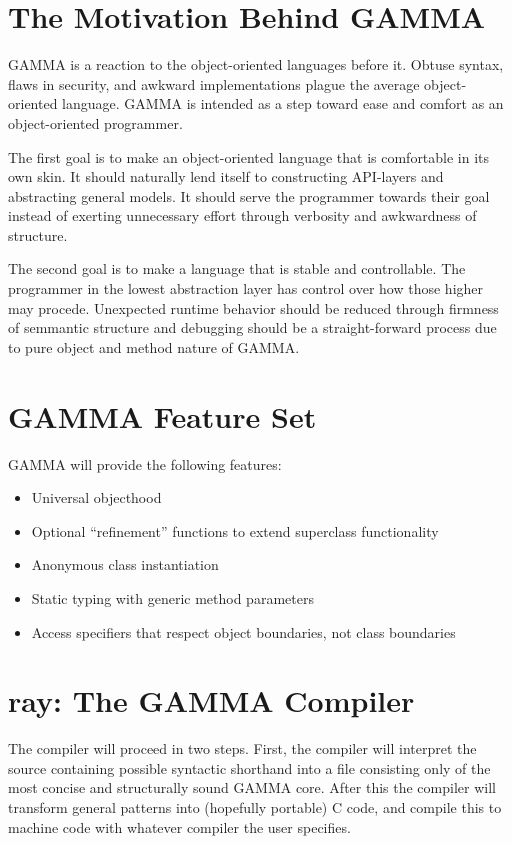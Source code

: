 \documentclass[10pt]{article}
\newcommand{\Lang}{GAMMA}
\newcommand{\Compiler}{ray}
\begin{document}
\section*{ The Motivation Behind \Lang{}}
\Lang{} is a reaction to the object-oriented languages before it. Obtuse syntax, flaws in security, and awkward implementations plague the average object-oriented language. \Lang{} is intended as a step toward ease and comfort as an object-oriented programmer.


The first goal is to make an object-oriented language that is comfortable in its own skin. It should naturally lend itself to constructing API-layers and abstracting general models. It should serve the programmer towards their goal instead of exerting unnecessary effort through verbosity and awkwardness of structure.


The second goal is to make a language that is stable and controllable. The programmer in the lowest abstraction layer has control over how those higher may procede. Unexpected runtime behavior should be reduced through firmness of semmantic structure and debugging should be a straight-forward process due to pure object and method nature of \Lang{}.

\section*{\Lang{} Feature Set}

\Lang{} will provide the following features:

\begin{itemize}
\item Universal objecthood
\item Optional ``refinement'' functions to extend superclass functionality
\item Anonymous class instantiation
\item Static typing with generic method parameters
\item Access specifiers that respect object boundaries, not class boundaries
\end{itemize}

\section*{\Compiler{}: The \Lang{} Compiler}

The compiler will proceed in two steps. First, the compiler will interpret
the source containing possible syntactic shorthand into a file
consisting only of the most concise and structurally sound GAMMA core. After this the compiler will transform
general patterns into (hopefully portable) C code, and compile this to
machine code with whatever compiler the user specifies.
\end{document}
